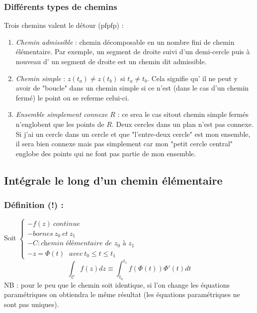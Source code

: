         \subsubsection{Différents types de chemins}
        Trois chemins valent le détour (pfpfp) :
        \begin{enumerate}
        \item \textit{Chemin admissible} : chemin décomposable en un nombre fini de chemin
        élémentaire. Par exemple, un segment de droite suivi d'un demi-cercle puis à nouveau d'
        un segment de droite est un chemin dit admissible.
        \item \textit{Chemin simple} : $z(t_a) \neq z(t_b)$ si $t_a \neq t_b$. Cela signifie qu'
        il ne peut y avoir de "boucle" dans un chemin simple si ce n'est (dans le cas d'un chemin
        fermé) le point ou se referme celui-ci.
        \item \textit{Ensemble simplement connexe $R$} : ce srea le cas sitout chemin simple fermés
        n'englobent que les points de $R$. Deux cercles dans un plan n'est pas connexe. Si j'ai un
        cercle dans un cercle et que "l'entre-deux cercle" est mon ensemble, il sera bien connexe
        mais pas simplement car mon "petit cercle central" englobe des points qui ne font pas partie
        de mon ensemble.
        \end{enumerate}
    
    \subsection{Intégrale le long d'un chemin élémentaire}
    \subsubsection{Définition (!) :}
    Soit $\left\{\begin{array}{l}
    - f(z)\ continue\\
    - bornes\ z_0\ et\ z_1\\
    - C : \textit{chemin élémentaire de $z_0$ à $z_1$}\\
    - z = \Phi(t)\ \ \ avec\ t_0 \leq t \leq t_1
    \end{array}\right.$ 
    \begin{equation}
    \int_\mathcal{C} f(z) dz \equiv \int_{t_0}^{t_1} f(\Phi(t))\Phi'(t) dt
    \end{equation}
    NB : pour le peu que le chemin soit identique, si l'on change les équations paramétriques on 
    obtiendra le même résultat (les équations paramétriques ne sont pas uniques).\\
    
